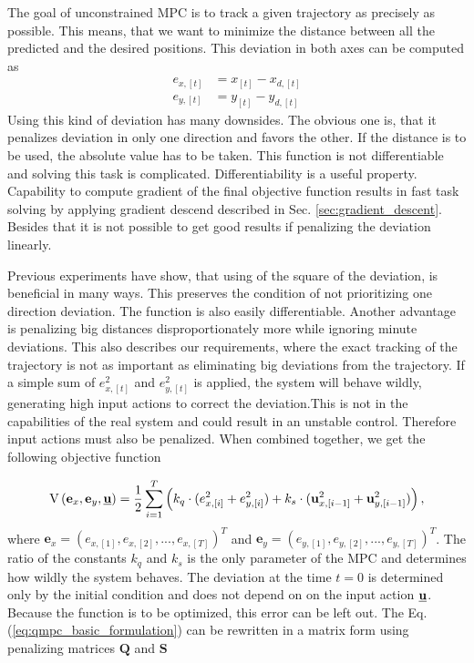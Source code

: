 \documentclass[a4paper,11pt,titlepage]{article}
\newcommand{\uvec}{\textbf{\underline{u}}}
\begin{document}
The goal of unconstrained MPC is to track a given trajectory as precisely as possible. This means, that we want to minimize the distance between all the predicted and the desired positions. This deviation in both axes can be computed as
\begin{equation}
\begin{split}
\label{eq:simple_err}
e_{x, [t]} &= x_{[t]} - x_{d, [t]}\\
e_{y, [t]} &= y_{[t]} - y_{d, [t]}
\end{split}
\end{equation}
Using this kind of deviation has many downsides. The obvious one is, that it penalizes deviation in only one direction and favors the other. If the distance is to be used, the absolute value has to be taken. This function is not differentiable \cite{stein1970singular} and solving this task is complicated. Differentiability is a useful property. Capability to compute gradient of the final objective function results in fast task solving by applying gradient descend described in Sec. \ref{sec:gradient_descent}. Besides that it is not possible to get good results if penalizing the deviation linearly. 

Previous experiments have show, that using of the square of the deviation, is beneficial in many ways. This preserves the condition of not prioritizing one direction deviation. The function is also easily differentiable. Another advantage is penalizing big distances disproportionately more while ignoring minute deviations. This also describes our requirements, where the exact tracking of the trajectory is not as important as eliminating big deviations from the trajectory. If a simple sum of $e_{x, [t]}^2$ and $e_{y, [t]}^2$ is applied, the system will behave wildly, generating high input actions to correct the deviation.This is not in the capabilities of the real system and could result in an unstable control. Therefore input actions must also be penalized. When combined together, we get the following objective function 

\begin{equation}
\label{eq:qmpc_basic_formulation}
\mathrm{V}\left(\textbf{e}_x, \textbf{e}_y, \uvec\right) 
= \frac{1}{2}\sum_{i=1}^{T}\left( k_q \cdot (e^2_{x, [i]}+e^2_{y, [i]}) + k_s \cdot (\textbf{u}^2_{x, [i-1]}+\textbf{u}^2_{y, [i-1]})\right),
\end{equation}
where $\textbf{e}_x = (e_{x, [1]}, e_{x, [2]}, ..., e_{x, [T]})^T$ and $\textbf{e}_y = (e_{y, [1]}, e_{y, [2]}, ..., e_{y, [T]})^T$. The ratio of the constants $k_q$ and $k_s$ is the only parameter of the MPC and determines how wildly the system behaves. The deviation at the time $t = 0$ is determined only by the initial condition and does not depend on on the input action $\uvec$. Because the function is to be optimized, this error can be left out. The Eq. (\ref{eq:qmpc_basic_formulation}) can be rewritten in a matrix form using penalizing matrices $\textbf{Q}$ and $\textbf{S}$
\end{document}
